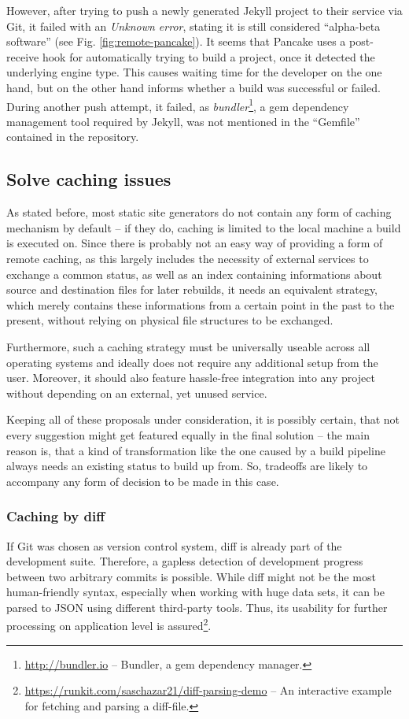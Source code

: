 However, after trying to push a newly generated Jekyll project to their service via Git, it failed with an \emph{Unknown error}, stating it is still considered ``alpha-beta software'' (see Fig. \ref{fig:remote-pancake}). It seems that Pancake uses a post-receive hook for automatically trying to build a project, once it detected the underlying engine type. This causes waiting time for the developer on the one hand, but on the other hand informs whether a build was successful or failed. During another push attempt, it failed, as \emph{bundler}\footnote{\url{http://bundler.io} -- Bundler, a gem dependency manager.}, a gem dependency management tool required by Jekyll, was not mentioned in the ``Gemfile'' contained in the repository.


\subsection{Solve caching issues}
\label{sec:solutions-caching}

As stated before, most static site generators do not contain any form of caching mechanism by default -- if they do, caching is limited to the local machine a build is executed on. Since there is probably not an easy way of providing a form of remote caching, as this largely includes the necessity of external services to exchange a common status, as well as an index containing informations about source and destination files for later rebuilds, it needs an equivalent strategy, which merely contains these informations from a certain point in the past to the present, without relying on physical file structures to be exchanged.

Furthermore, such a caching strategy must be universally useable across all operating systems and ideally does not require any additional setup from the user. Moreover, it should also feature hassle-free integration into any project without depending on an external, yet unused service.

Keeping all of these proposals under consideration, it is possibly certain, that not every suggestion might get featured equally in the final solution -- the main reason is, that a kind of transformation like the one caused by a build pipeline always needs an existing status to build up from. So, tradeoffs are likely to accompany any form of decision to be made in this case.

\subsubsection{Caching by diff}
If Git was chosen as version control system, diff is already part of the development suite. Therefore, a gapless detection of development progress between two arbitrary commits is possible. While diff might not be the most human-friendly syntax, especially when working with huge data sets, it can be parsed to JSON using different third-party tools. Thus, its usability for further processing on application level is assured\footnote{\url{https://runkit.com/saschazar21/diff-parsing-demo} -- An interactive example for fetching and parsing a diff-file.}.

